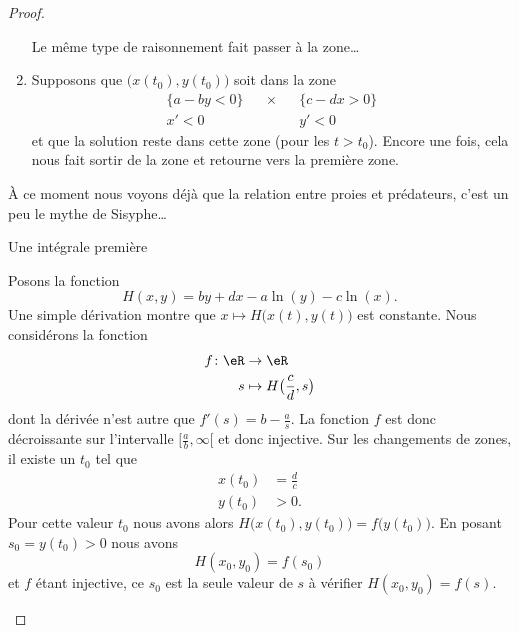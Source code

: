 \begin{proof}
\begin{subproof}
\begin{enumerate}
        Le même type de raisonnement fait passer à la zone\ldots
    \item
        Supposons que \( \big( x(t_0),y(t_0) \big) \) soit dans la zone
        \begin{subequations}
            \begin{align}
                \{ a-by<0 \}&&\times&& \{ c-dx>0 \}\\
                x'<0&&&&y'<0
            \end{align}
        \end{subequations}
        et que la solution reste dans cette zone (pour les \( t>t_0\)). Encore une fois, cela nous fait sortir de la zone et retourne vers la première zone.
        \end{enumerate}

       À ce moment nous voyons déjà que la relation entre proies et prédateurs, c'est un peu le mythe de Sisyphe\dots

   \item[Une intégrale première]

       Posons la fonction
       \begin{equation}
           H(x,y)=by+dx-a\ln(y)-c\ln(x).
       \end{equation}
       Une simple dérivation montre que  \(  x\mapsto H\big( x(t),y(t) \big) \) est constante. Nous considérons la fonction
       \begin{equation}
           \begin{aligned}
               f\colon \eR&\to \eR \\
               s&\mapsto H\big( \frac{ c }{ d },s \big)
           \end{aligned}
       \end{equation}
       dont la dérivée n'est autre que \( f'(s)=b-\frac{ a }{ s }\). La fonction \( f\) est donc décroissante sur l'intervalle \( \mathopen[ \frac{ a }{ b } , \infty [\) et donc injective. Sur les changements de zones, il existe un \( t_0\) tel que
           \begin{subequations}
               \begin{align}
                   x(t_0)&=\frac{ d }{ c }\\
                   y(t_0)&>0.
               \end{align}
           \end{subequations}
            Pour cette valeur \( t_0\) nous avons alors \( H\big( x(t_0),y(t_0) \big)=  f\big( y(t_0) \big)  \). En posant \( s_0=y(t_0)>0\) nous avons
            \begin{equation}
                H(x_0,y_0)=f(s_0)
            \end{equation}
            et \( f\) étant injective, ce \( s_0\) est la seule valeur de \( s\) à vérifier \( H(x_0,y_0)=f(s)\).


\end{subproof}
\end{proof}
